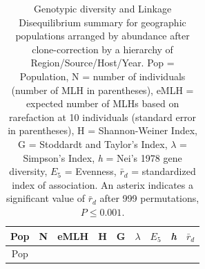 \newpage

\begin{longtable}[]{@{}crrrrllrl@{}}
\caption{\label{tab:iatab} Genotypic diversity and Linkage Disequilibrium
summary for geographic populations arranged by abundance after
clone-correction by a hierarchy of Region/Source/Host/Year. Pop =
Population, N = number of individuals (number of MLH in parentheses),
eMLH = expected number of MLHs based on rarefaction at 10 individuals
(standard error in parentheses), H = Shannon-Weiner Index, G = Stoddardt
and Taylor's Index, \(\lambda\) = Simpson's Index, \emph{h} = Nei's 1978
gene diversity, \(E_5\) = Evenness, \(\bar{r}_d\) = standardized index
of association. An asterix indicates a significant value of
\(\bar{r}_d\) after 999 permutations, \(P \leq 0.001\).}\tabularnewline
\toprule
\begin{minipage}[b]{0.12\columnwidth}\centering\strut
Pop\strut
\end{minipage} & \begin{minipage}[b]{0.08\columnwidth}\raggedleft\strut
N\strut
\end{minipage} & \begin{minipage}[b]{0.13\columnwidth}\raggedleft\strut
eMLH\strut
\end{minipage} & \begin{minipage}[b]{0.04\columnwidth}\raggedleft\strut
H\strut
\end{minipage} & \begin{minipage}[b]{0.05\columnwidth}\raggedleft\strut
G\strut
\end{minipage} & \begin{minipage}[b]{0.11\columnwidth}\raggedright\strut
\(\lambda\)\strut
\end{minipage} & \begin{minipage}[b]{0.06\columnwidth}\raggedright\strut
\(E_5\)\strut
\end{minipage} & \begin{minipage}[b]{0.06\columnwidth}\raggedleft\strut
\emph{h}\strut
\end{minipage} & \begin{minipage}[b]{0.07\columnwidth}\raggedright\strut
\(\bar{ r}_d\)\strut
\end{minipage}\tabularnewline
\midrule
\endfirsthead
\toprule
\begin{minipage}[b]{0.12\columnwidth}\centering\strut
Pop\strut
\end{minipage} & \begin{minipage}[b]{0.08\columnwidth}\raggedleft\strut

\end{minipage}
\end{longtable}
